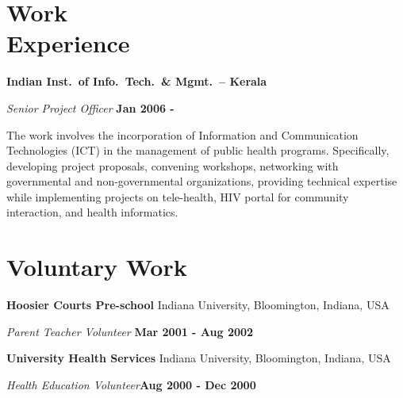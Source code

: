 \documentclass[margin,line]{res}
\begin{document}
\begin{resume}

\section{\sc Work\\ Experience}
{\bf Indian Inst.\ of Info.\ Tech.\ \& Mgmt.\ -- Kerala} 
\vspace{-0.4cm}

{\em Senior Project Officer} \hfill {\bf Jan 2006 - }

\vspace{-0.2cm}

The work involves the incorporation of Information and
Communication Technologies (ICT) in the management of public
health programs.  Specifically, developing project
proposals, convening workshops, networking with governmental
and non-governmental organizations, providing technical
expertise while implementing projects on tele-health, HIV
portal for community interaction, and health informatics.

\section{\sc Voluntary Work}

{\bf Hoosier Courts Pre-school} Indiana University, Bloomington,
Indiana, USA
\vspace{-0.4cm}

{\em Parent Teacher Volunteer} \hfill {\bf Mar 2001 - Aug
2002}

\vspace{-0.2cm}


{\bf University Health Services} Indiana University,
Bloomington, Indiana, USA

\vspace{-0.4cm}

\emph{Health Education Volunteer}\hfill {\bf Aug 2000 - Dec 2000}

\vspace{-0.2cm}


\end{resume}
\end{document}

